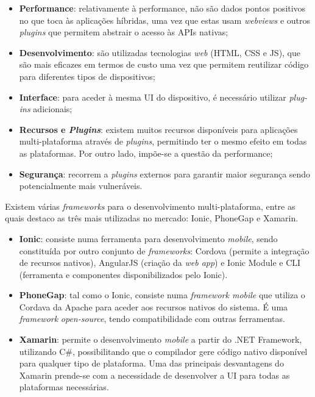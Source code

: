 \begin{itemize}
	\item \textbf{Performance}: relativamente à performance, não são dados pontos positivos no que toca às aplicações híbridas, uma vez que estas usam  \textit{webviews} e outros \textit{plugins} que permitem abstrair o acesso às APIs nativas; 

	
	\item \textbf{Desenvolvimento}: são utilizadas tecnologias \textit{web} (\ac{HTML}, \ac{CSS} e \ac{JS}), que são mais eficazes em termos de custo uma vez que permitem reutilizar código para diferentes tipos de dispositivos; 
	
	
	\item \textbf{Interface}: para aceder à mesma \ac{UI} do dispositivo, é necessário utilizar \textit{plug-ins} adicionais; 
	
	
	\item \textbf{Recursos e \textit{Plugins}}: existem muitos recursos disponíveis para aplicações \linebreak multi-plataforma através de \textit{plugins}, permitindo ter o mesmo efeito em todas as plataformas. Por outro lado, impõe-se a questão da performance; 

	
	\item \textbf{Segurança}: recorrem a \textit{plugins} externos para garantir maior segurança sendo potencialmente mais vulneráveis.
	
	
\end{itemize}

Existem várias \textit{frameworks} para o desenvolvimento multi-plataforma, entre as quais destaco as três mais utilizadas no mercado: Ionic, PhoneGap e Xamarin. 

\begin{itemize}
	\item \textbf{Ionic}: consiste numa ferramenta para desenvolvimento \textit{mobile}, sendo constituída por outro conjunto de \textit{frameworks}: Cordova (permite a integração de recursos nativos), AngularJS (criação da \textit{web app}) e Ionic Module e CLI (ferramenta e componentes disponibilizados pelo Ionic)\cite{Ionic2016}. 
	
	\item \textbf{PhoneGap}: tal como o Ionic, consiste numa \textit{framework mobile} que utiliza o Cordava da Apache para aceder aos recursos nativos do sistema. É uma \textit{framework} \textit{open-source}, tendo compatibilidade com outras ferramentas. 
	
	\item \textbf{Xamarin}: permite o desenvolvimento \textit{mobile} a partir do .NET Framework, utilizando C\#, possibilitando que o compilador gere código nativo disponível para qualquer tipo de plataforma. Uma das principais desvantagens do Xamarin prende-se com a necessidade de desenvolver a \ac{UI} para todas as plataformas necessárias. 
\end{itemize}
 


